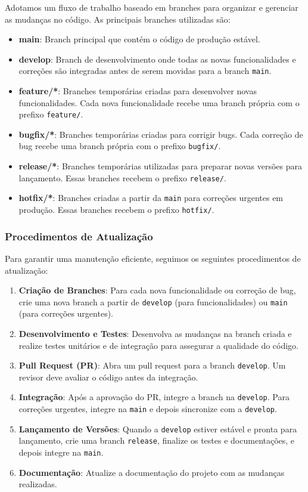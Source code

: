 \documentclass[../main.tex]{subfiles}
\begin{document}
Adotamos um fluxo de trabalho baseado em branches para organizar e gerenciar as mudanças no código. As principais branches utilizadas são:

\begin{itemize}
    \item \textbf{main}: Branch principal que contém o código de produção estável.
    \item \textbf{develop}: Branch de desenvolvimento onde todas as novas funcionalidades e correções são integradas antes de serem movidas para a branch \texttt{main}.
    \item \textbf{feature/*}: Branches temporárias criadas para desenvolver novas funcionalidades. Cada nova funcionalidade recebe uma branch própria com o prefixo \texttt{feature/}.
    \item \textbf{bugfix/*}: Branches temporárias criadas para corrigir bugs. Cada correção de bug recebe uma branch própria com o prefixo \texttt{bugfix/}.
    \item \textbf{release/*}: Branches temporárias utilizadas para preparar novas versões para lançamento. Essas branches recebem o prefixo \texttt{release/}.
    \item \textbf{hotfix/*}: Branches criadas a partir da \texttt{main} para correções urgentes em produção. Essas branches recebem o prefixo \texttt{hotfix/}.
\end{itemize}

\subsubsection{Procedimentos de Atualização}

Para garantir uma manutenção eficiente, seguimos os seguintes procedimentos de atualização:

\begin{enumerate}
    \item \textbf{Criação de Branches}: Para cada nova funcionalidade ou correção de bug, crie uma nova branch a partir de \texttt{develop} (para funcionalidades) ou \texttt{main} (para correções urgentes).
    \item \textbf{Desenvolvimento e Testes}: Desenvolva as mudanças na branch criada e realize testes unitários e de integração para assegurar a qualidade do código.
    \item \textbf{Pull Request (PR)}: Abra um pull request para a branch \texttt{develop}. Um revisor deve avaliar o código antes da integração.
    \item \textbf{Integração}: Após a aprovação do PR, integre a branch na \texttt{develop}. Para correções urgentes, integre na \texttt{main} e depois sincronize com a \texttt{develop}.
    \item \textbf{Lançamento de Versões}: Quando a \texttt{develop} estiver estável e pronta para lançamento, crie uma branch \texttt{release}, finalize os testes e documentações, e depois integre na \texttt{main}.
    \item \textbf{Documentação}: Atualize a documentação do projeto com as mudanças realizadas.
\end{enumerate}
\end{document}
